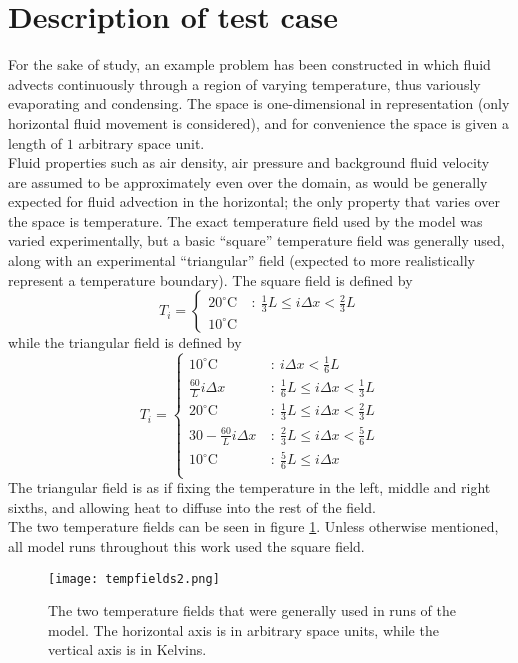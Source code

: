 \documentclass[11pt]{article}
\begin{document}
\section{Description of test case}
For the sake of study, an example problem has been constructed in which fluid advects continuously through a region of varying temperature, thus variously evaporating and condensing. The space is one-dimensional in representation (only horizontal fluid movement is considered), and for convenience the space is given a length of $1$ arbitrary space unit. \\
Fluid properties such as air density, air pressure and background fluid velocity are assumed to be approximately even over the domain, as would be generally expected for fluid advection in the horizontal; the only property that varies over the space is temperature. The exact temperature field used by the model was varied experimentally, but a basic ``square'' temperature field was generally used, along with an experimental ``triangular'' field (expected to more realistically represent a temperature boundary). The square field is defined by
\[
T_i = \begin{cases}
20^{\circ}\text{C} & ~:~ \frac{1}{3}L \leq i\Delta x < \frac{2}{3}L \\
10^{\circ}\text{C} & ~
\end{cases}
\]
while the triangular field is defined by
\[
T_i = \begin{cases}
10^{\circ}\text{C} & ~:~ i\Delta x < \frac{1}{6}L \\
\frac{60}{L}i\Delta x & ~:~ \frac{1}{6}L \leq i\Delta x < \frac{1}{3}L \\
20^{\circ}\text{C} & ~:~ \frac{1}{3}L \leq i\Delta x < \frac{2}{3}L \\
30-\frac{60}{L}i\Delta x & ~:~ \frac{2}{3}L \leq i\Delta x < \frac{5}{6}L \\
10^{\circ}\text{C} & ~:~ \frac{5}{6}L \leq i\Delta x \\
\end{cases}
\]
The triangular field is as if fixing the temperature in the left, middle and right sixths, and allowing heat to diffuse into the rest of the field. \\
The two temperature fields can be seen in figure \ref{fig:tempfields}. Unless otherwise mentioned, all model runs throughout this work used the square field.
\begin{figure}[H]
\centering
\texttt{[image: tempfields2.png]}
\caption{The two temperature fields that were generally used in runs of the model. The horizontal axis is in arbitrary space units, while the vertical axis is in Kelvins.}
\label{fig:tempfields}
\end{figure}
\end{document}
